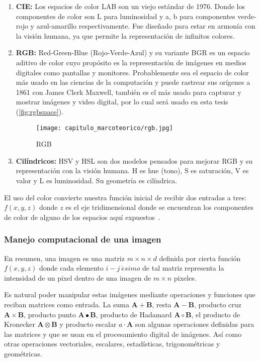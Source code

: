 \begin{enumerate}
    \item{\textbf{CIE:}} Los espacios de color LAB son un viejo estándar de
    1976. Donde los componentes de color son L para luminosidad y a, b para
    componentes verde-rojo y azul-amarillo respectivamente. Fue diseñado para
    estar en armonía con la visión humana, ya que permite la representación de
    infinitos colores.

    \item{\textbf{RGB:}} Red-Green-Blue (Rojo-Verde-Azul) y su variante BGR es
    un espacio aditivo de color cuyo propósito es la representación de imágenes
    en medios digitales como pantallas y monitores. Probablemente sea el espacio
    de color más usado en las ciencias de la computación y puede rastrear sus
    orígenes a 1861 con James Clerk Maxwell, también es el más usado para
    capturar y mostrar imágenes y video digital, por lo cual será usado en esta
    tesis (\autoref{fig:rgbspace}). 

    \begin{figure}[H]
        \centering
        \texttt{[image: capitulo\_marcoteorico/rgb.jpg]}
        \caption{RGB}\label{fig:rgbspace}
    \end{figure}

    \item{\textbf{Cilíndricos:}} HSV y HSL son dos modelos pensados para mejorar
    RGB y su representación con la visión humana. H es hue (tono), S es
    saturación, V es valor y L es luminosidad. Su geometría es cilíndrica.
\end{enumerate}

El uso del color convierte nuestra función inicial de recibir dos entradas a
tres: \(f(x,y,z)\) donde \(z\) es el eje tridimensional donde se encuentran los
componentes de color de alguno de los espacios aquí expuestos~\cite{Vernon1991}.

\subsubsection{Manejo computacional de una imagen}

En resumen, una imagen es una matriz \(m \times n \times d\) definida por cierta
función \(f(x,y,z)\) donde cada elemento \(i-j~\acute{e}simo\) de tal matriz
representa la intensidad de un pixel dentro de una imagen de \(m \times n \)
pixeles. 

Es natural poder manipular estas imágenes mediante operaciones y funciones que
reciban matrices como entrada. La suma \(\mathbf{A} + \mathbf{B}\), resta
\(\mathbf{A} - \mathbf{B}\), producto cruz \(\mathbf{A} \times \mathbf{B}\),
producto punto \(\mathbf{A} \bullet \mathbf{B}\),  producto de Hadamard
\(\mathbf{A} \circ \mathbf{B}\), el producto de Kronecker \(\mathbf{A} \otimes
\mathbf{B}\) y producto escalar \(a \cdot \mathbf{A}\) son algunas operaciones
definidas para las matrices y que se usan en el procesamiento digital de
imágenes. Así como otras operaciones vectoriales, escalares, estadísticas,
trigonométricas y geométricas.

